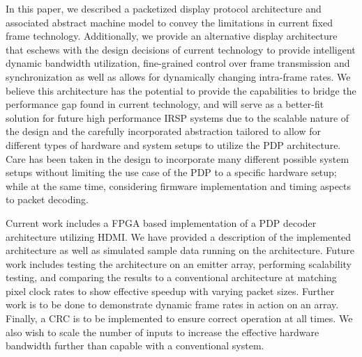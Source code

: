 \label{chap:conclusion}
In this paper, we described a packetized display protocol architecture and associated abstract machine model to convey the limitations in current fixed frame technology. Additionally, we provide an alternative display architecture that eschews with the design decisions of current technology to provide intelligent dynamic bandwidth utilization, fine-grained control over frame transmission and synchronization as well as allows for dynamically changing intra-frame rates. We believe this architecture has the potential to provide the capabilities to bridge the performance gap found in current technology, and will serve as a better-fit solution for future high performance IRSP systems due to the scalable nature of the design and the carefully incorporated abstraction tailored to allow for different types of hardware and system setups to utilize the PDP architecture. Care has been taken in the design to incorporate many different possible system setups without limiting the use case of the PDP to a specific hardware setup; while at the same time, considering firmware implementation and timing aspects to packet decoding.

Current work includes a FPGA based implementation of a PDP decoder architecture utilizing HDMI. We have provided a description of the implemented architecture as well as simulated sample data running on the architecture. Future work includes testing the architecture on an emitter array, performing scalability testing, and comparing the results to a conventional architecture at matching pixel clock rates to show effective speedup with varying packet sizes. Further work is to be done to demonstrate dynamic frame rates in action on an array. Finally, a CRC is to be implemented to ensure correct operation at all times. We also wish to scale the number of inputs to increase the effective hardware bandwidth further than capable with a conventional system.
